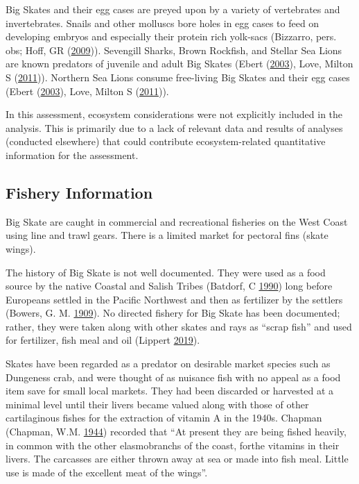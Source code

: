 \documentclass[12pt,]{article}
\begin{document}
Big Skates and their egg cases are preyed upon by a variety of
vertebrates and invertebrates. Snails and other molluscs bore holes in
egg cases to feed on developing embryos and especially their protein
rich yolk-sacs (Bizzarro, pers. obs; Hoff, GR
(\protect\hyperlink{ref-Hoff2009}{2009})). Sevengill Sharks, Brown
Rockfish, and Stellar Sea Lions are known predators of juvenile and
adult Big Skates (Ebert (\protect\hyperlink{ref-Ebert2003}{2003}), Love,
Milton S (\protect\hyperlink{ref-Love2011}{2011})). Northern Sea Lions
consume free-living Big Skates and their egg cases (Ebert
(\protect\hyperlink{ref-Ebert2003}{2003}), Love, Milton S
(\protect\hyperlink{ref-Love2011}{2011})).

In this assessment, ecosystem considerations were not explicitly
included in the analysis. This is primarily due to a lack of relevant
data and results of analyses (conducted elsewhere) that could contribute
ecosystem-related quantitative information for the assessment.

\hypertarget{fishery-information}{%
\subsection{Fishery Information}\label{fishery-information}}

Big Skate are caught in commercial and recreational fisheries on the
West Coast using line and trawl gears. There is a limited market for
pectoral fins (skate wings).

The history of Big Skate is not well documented. They were used as a
food source by the native Coastal and Salish Tribes (Batdorf, C
\protect\hyperlink{ref-Batdorf1990}{1990}) long before Europeans settled
in the Pacific Northwest and then as fertilizer by the settlers (Bowers,
G. M. \protect\hyperlink{ref-Bowers1909}{1909}). No directed fishery for
Big Skate has been documented; rather, they were taken along with other
skates and rays as ``scrap fish'' and used for fertilizer, fish meal and
oil (Lippert \protect\hyperlink{ref-GregLippert}{2019}).

Skates have been regarded as a predator on desirable market species such
as Dungeness crab, and were thought of as nuisance fish with no appeal
as a food item save for small local markets. They had been discarded or
harvested at a minimal level until their livers became valued along with
those of other cartilaginous fishes for the extraction of vitamin A in
the 1940s. Chapman (Chapman, W.M.
\protect\hyperlink{ref-Chapman1944}{1944}) recorded that ``At present
they are being fished heavily, in common with the other elasmobranchs of
the coast, forthe vitamins in their livers. The carcasses are either
thrown away at sea or made into fish meal. Little use is made of the
excellent meat of the wings''.
\end{document}
